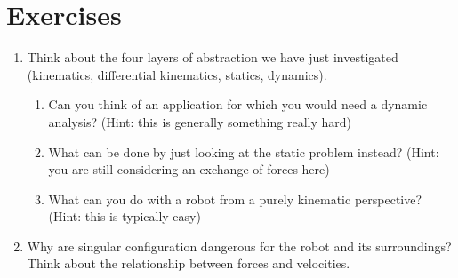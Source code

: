 \section*{Exercises}\small

\begin{enumerate}
\item Think about the four layers of abstraction we have just investigated (kinematics, differential kinematics, statics, dynamics).
\begin{enumerate}
\item Can you think of an application for which you would need a dynamic analysis? (Hint: this is generally something really hard)
\item What can be done by just looking at the static problem instead? (Hint: you are still considering an exchange of forces here)
\item What can you do with a robot from a purely kinematic perspective? (Hint: this is typically easy)
\end{enumerate}
\item Why are singular configuration dangerous for the robot and its surroundings? Think about the relationship between forces and velocities.
\end{enumerate}
